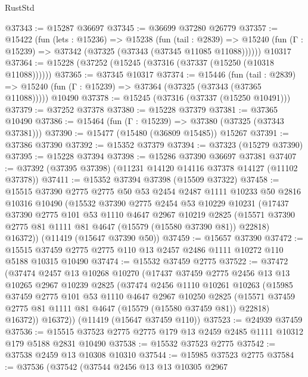 \begin{lexlean}{RustStd}
\begin{coremodule}
@37343 := @15287 @36697
@37345 := @36699 @37280 @26779
@37357 := @15422
    (fun (lets : @15236) =>
    @15238
      (fun (tail : @2839) =>
      @15240 (fun (Γ : @15239) => @37342 (@37325 (@37343 (@37345 @11085 @11088))))))
    @10317
@37364 := @15228 (@37252 (@15245 (@37316 (@37337 (@15250 (@10318 @11088))))))
@37365 := @37345 @10317
@37374 := @15446
    (fun (tail : @2839) => @15240 (fun (Γ : @15239) => @37364 (@37325 (@37343 (@37365 @11088)))))
    @10490
@37378 := @15245 (@37316 (@37337 (@15250 @10491)))
@37379 := @37252 @37378
@37380 := @15228 @37379
@37381 := @37365 @10490
@37386 := @15464 (fun (Γ : @15239) => @37380 (@37325 (@37343 @37381)))
@37390 := @15477 (@15480 (@36809 @15485)) @15267
@37391 := @37386 @37390
@37392 := @15352 @37379
@37394 := @37323 (@15279 @37390)
@37395 := @15228 @37394
@37398 := @15286 @37390 @36697 @37381
@37407 := @37392 (@37395 @37398) (@11231 @14120 @14116 @37378 @14127 (@11102 @37378))
@37411 := @15352 @37394 @37398 (@15509 @37322)
@37458 := @15515
    @37390
    @2775
    @2775
    @50
    @53
    @2454
    @2487
    @1111
    @10233
    @50
    @2816
    @10316
    @10490
    (@15532
      @37390
      @2775
      @2454
      @53
      @10229
      @10231
      (@17437
        @37390
        @2775
        @101
        @53
        @1110
        @4647
        @2967
        @10219
        @2825
        (@15571 @37390 @2775 @81 @1111 @81 @4647 (@15579 (@15580 @37390 @81)) @22818)
        @16372))
    (@11419 (@15647 @37390 @50))
@37459 := @15657 @37390
@37472 := @15515 @37459 @2775 @2775 @110 @13 @2457 @2486 @1111 @10272 @110 @5188 @10315 @10490
@37474 := @15532 @37459 @2775
@37522 := @37472
    (@37474
      @2457
      @13
      @10268
      @10270
      (@17437
        @37459
        @2775
        @2456
        @13
        @13
        @10265
        @2967
        @10239
        @2825
        (@37474
          @2456
          @1110
          @10261
          @10263
          (@15985
            @37459
            @2775
            @101
            @53
            @1110
            @4647
            @2967
            @10250
            @2825
            (@15571 @37459 @2775 @81 @1111 @81 @4647 (@15579 (@15580 @37459 @81)) @22818)
            @16372))
        @16372))
    (@11419 (@15647 @37459 @110))
@37523 := @24939 @37459
@37536 := @15515 @37523 @2775 @2775 @179 @13 @2459 @2485 @1111 @10312 @179 @5188 @2831 @10490
@37538 := @15532 @37523 @2775
@37542 := @37538 @2459 @13 @10308 @10310
@37544 := @15985 @37523 @2775
@37584 := @37536
    (@37542
      (@37544
        @2456
        @13
        @13
        @10305
        @2967

\end{coremodule}
\end{lexlean}
